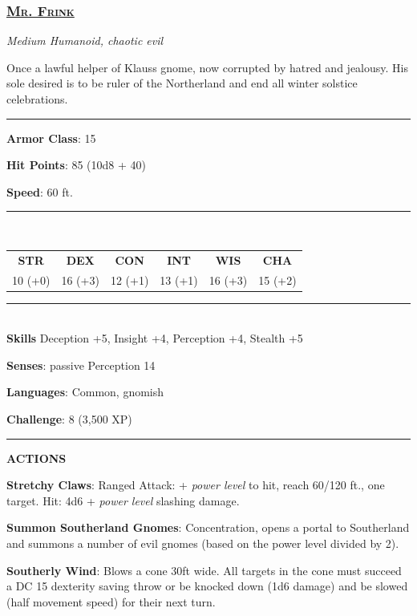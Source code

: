 \subsubsection*{\underline{\textsc{\Large Mr. Frink}}}
\noindent\emph{Medium Humanoid, chaotic evil}

Once a lawful helper of Klauss gnome, now corrupted by hatred and jealousy. His sole desired is to be ruler of the Northerland and end all winter solstice celebrations.

\noindent\rule{0.5\textwidth}{0.5pt}

\noindent\textbf{Armor Class}: 15

\noindent\textbf{Hit Points}: 85 (10d8 + 40)

\noindent\textbf{Speed}: 60 ft.

\noindent\rule{0.5\textwidth}{0.5pt} \\
\begin{table}[H]
	\begin{tabular}{cccccc}
		\textbf{STR} & \textbf{DEX} & \textbf{CON} & \textbf{INT} & \textbf{WIS} & \textbf{CHA} \\
		10 (+0) & 16 (+3) & 12 (+1) & 13 (+1) & 16 (+3) & 15 (+2) \\
	\end{tabular}
\end{table}
\noindent\rule{0.5\textwidth}{0.5pt} \\

\noindent\textbf{Skills} Deception +5, Insight +4, Perception +4, Stealth +5

\noindent\textbf{Senses}: passive Perception 14

\noindent\textbf{Languages}: Common, gnomish

\noindent\textbf{Challenge}: 8 (3,500 XP)

\noindent\rule{0.5\textwidth}{0.5pt}

\noindent\textbf{ACTIONS}

\noindent\textbf{Stretchy Claws}: Ranged Attack: + \emph{power level} to hit, reach 60/120 ft., one target. Hit: 4d6 + \emph{power level} slashing damage.

\noindent\textbf{Summon Southerland Gnomes}: Concentration, opens a portal to Southerland and summons a number of evil gnomes (based on the power level divided by 2).

\noindent\textbf{Southerly Wind}: Blows a cone 30ft wide. All targets in the cone must succeed a DC 15 dexterity saving throw or be knocked down (1d6 damage) and be slowed (half movement speed) for their next turn.

